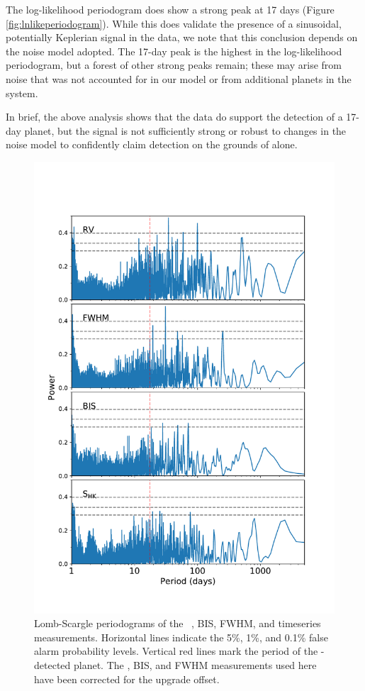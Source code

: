 \documentclass[modern]{aastex62}
\begin{document}
The log-likelihood periodogram does show a strong peak at 17 days (Figure \ref{fig:lnlikeperiodogram}). 
While this does validate the presence of a sinusoidal, potentially Keplerian signal in the data, we note that this conclusion depends on the noise model adopted. 
The 17-day peak is the highest in the log-likelihood periodogram, but a forest of other strong peaks remain; these may arise from noise that was not accounted for in our model or from additional planets in the system. 

In brief, the above analysis shows that the \RV data do support the detection of a 17-day planet, but the signal is not sufficiently strong or robust to changes in the noise model to confidently claim detection on the grounds of \RVs alone.



\begin{figure}
    \centering
    \includegraphics[width=\textwidth]{periodograms.pdf}
    \caption{Lomb-Scargle periodograms of the \HARPS\ \RV, BIS, FWHM, and \shk timeseries measurements. Horizontal lines indicate the 5\%, 1\%, and 0.1\% false alarm probability levels. Vertical red lines mark the period of the \TESS-detected planet. The \RV, BIS, and FWHM measurements used here have been corrected for the \HARPS upgrade offset.}
    \label{fig:periodograms}
\end{figure}
\end{document}
